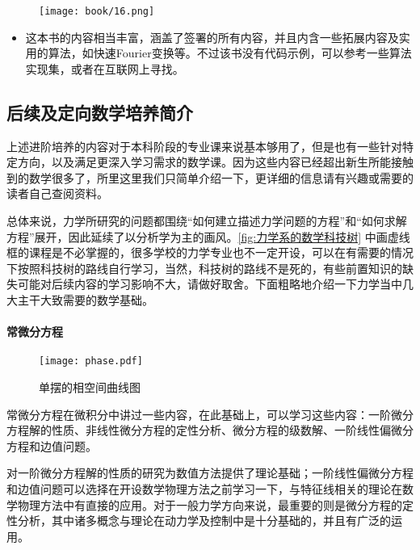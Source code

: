 \begin{figure}[h]
    \centering
    \texttt{[image: book/16.png]}
\end{figure}

\begin{itemize}
    \item \textcite[数值分析]{李庆扬2009}

          这本书的内容相当丰富，涵盖了签署的所有内容，并且内含一些拓展内容及实用的算法，如快速Fourier变换等。不过该书没有代码示例，可以参考一些算法实现集，或者在互联网上寻找。
\end{itemize}



\subsection{后续及定向数学培养简介}

上述进阶培养的内容对于本科阶段的专业课来说基本够用了，但是也有一些针对特定方向，以及满足更深入学习需求的数学课。因为这些内容已经超出新生所能接触到的数学很多了，所里这里我们只简单介绍一下，更详细的信息请有兴趣或需要的读者自己查阅资料。

总体来说，力学所研究的问题都围绕“如何建立描述力学问题的方程”和“如何求解方程”展开，因此延续了以分析学为主的画风。\autoref{fig:力学系的数学科技树} 中画虚线框的课程是不必掌握的，很多学校的力学专业也不一定开设，可以在有需要的情况下按照科技树的路线自行学习，当然，科技树的路线不是死的，有些前置知识的缺失可能对后续内容的学习影响不大，请做好取舍。下面粗略地介绍一下力学当中几大主干大致需要的数学基础。

\paragraph{常微分方程}

\begin{figure}[h]
    \centering
    \texttt{[image: phase.pdf]}
    \caption{单摆的相空间曲线图}
\end{figure}

常微分方程在微积分中讲过一些内容，在此基础上，可以学习这些内容：一阶微分方程解的性质、非线性微分方程的定性分析、微分方程的级数解、一阶线性偏微分方程和边值问题。

对一阶微分方程解的性质的研究为数值方法提供了理论基础；一阶线性偏微分方程和边值问题可以选择在开设数学物理方法之前学习一下，与特征线相关的理论在数学物理方法中有直接的应用。对于一般力学方向来说，最重要的则是微分方程的定性分析，其中诸多概念与理论在动力学及控制中是十分基础的，并且有广泛的运用。

